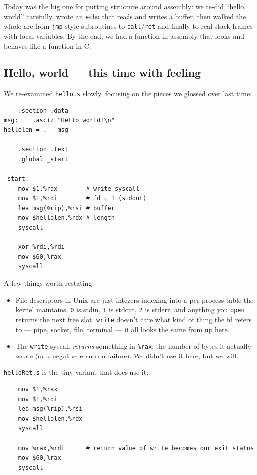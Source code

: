 \documentclass[11pt]{article}
\begin{document}
Today was the big one for putting structure around assembly: we
re-did ``hello, world'' carefully, wrote an \texttt{echo} that reads
and writes a buffer, then walked the whole arc from
\texttt{jmp}-style subroutines to \texttt{call}/\texttt{ret} and
finally to real stack frames with local variables. By the end, we
had a function in assembly that looks and behaves like a function in C.

\subsection*{Hello, world --- this time with feeling}

We re-examined \texttt{hello.s} slowly, focusing on the pieces we
glossed over last time:

\begin{lstlisting}
    .section .data
msg:    .asciz "Hello world!\n"
hellolen = . - msg

    .section .text
    .global _start

_start:
    mov $1,%rax        # write syscall
    mov $1,%rdi        # fd = 1 (stdout)
    lea msg(%rip),%rsi # buffer
    mov $hellolen,%rdx # length
    syscall

    xor %rdi,%rdi
    mov $60,%rax
    syscall
\end{lstlisting}

A few things worth restating:
\begin{itemize}
  \item File descriptors in Unix are just integers indexing into a
    per-process table the kernel maintains. \texttt{0} is stdin,
    \texttt{1} is stdout, \texttt{2} is stderr, and anything you
    \texttt{open} returns the next free slot. \texttt{write} doesn't
    care what kind of thing the fd refers to --- pipe, socket, file,
    terminal --- it all looks the same from up here.
  \item The \texttt{write} syscall \emph{returns} something in
    \texttt{\%rax}: the number of bytes it actually wrote (or a
    negative errno on failure). We didn't use it here, but we will.
\end{itemize}

\texttt{helloRet.s} is the tiny variant that does use it:

\begin{lstlisting}
    mov $1,%rax
    mov $1,%rdi
    lea msg(%rip),%rsi
    mov $hellolen,%rdx
    syscall

    mov %rax,%rdi      # return value of write becomes our exit status
    mov $60,%rax
    syscall
\end{lstlisting}
\end{document}
